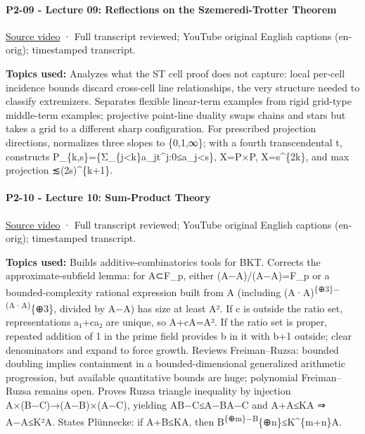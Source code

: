 \paragraph{P2-09 - Lecture 09: Reflections on the Szemeredi-Trotter Theorem}\label{p2-09---lecture-09-reflections-on-the-szemeredi-trotter-theorem}

\href{https://www.youtube.com/watch?v=lvdIUKULiak}{Source video} · Full transcript reviewed; YouTube original English captions (en-orig); timestamped transcript.

\textbf{Topics used:} Analyzes what the ST cell proof does not capture: local per-cell incidence bounds discard cross-cell line relationships, the very structure needed to classify extremizers. Separates flexible linear-term examples from rigid grid-type middle-term examples; projective point-line duality swaps chains and stars but takes a grid to a different sharp configuration. For prescribed projection directions, normalizes three slopes to \{0,1,∞\}; with a fourth transcendental t, constructs P\_\{k,s\}=\{Σ\_\{j\textless k\}a\_jt\^{}j:0≤a\_j\textless s\}, X=P×P, \textbar X\textbar=s\^{}\{2k\}, and max projection ≲(2s)\^{}\{k+1\}.

\paragraph{P2-10 - Lecture 10: Sum-Product Theory}\label{p2-10---lecture-10-sum-product-theory}

\href{https://www.youtube.com/watch?v=VCOrx2jEKXk}{Source video} · Full transcript reviewed; YouTube original English captions (en-orig); timestamped transcript.

\textbf{Topics used:} Builds additive-combinatorics tools for BKT. Corrects the approximate-subfield lemma: for A⊂F\_p, either (A−A)/(A−A)=F\_p or a bounded-complexity rational expression built from A (including (A·A)\textsuperscript{\{⊕3\}−(A·A)}\{⊕3\}, divided by A−A) has size at least \textbar A\textbar². If c is outside the ratio set, representations a₁+ca₂ are unique, so \textbar A+cA\textbar=\textbar A\textbar². If the ratio set is proper, repeated addition of 1 in the prime field provides b in it with b+1 outside; clear denominators and expand to force growth. Reviews Freiman--Ruzsa: bounded doubling implies containment in a bounded-dimensional generalized arithmetic progression, but available quantitative bounds are huge; polynomial Freiman--Ruzsa remains open. Proves Ruzsa triangle inequality by injection A×(B−C)→(A−B)×(A−C), yielding \textbar A\textbar\textbar B−C\textbar≤\textbar A−B\textbar\textbar A−C\textbar{} and \textbar A+A\textbar≤K\textbar A\textbar{} ⇒ \textbar A−A\textbar≤K²\textbar A\textbar. States Plünnecke: if \textbar A+B\textbar≤K\textbar A\textbar, then \textbar B\textsuperscript{\{⊕m\}−B}\{⊕n\}\textbar≤K\^{}\{m+n\}\textbar A\textbar.

